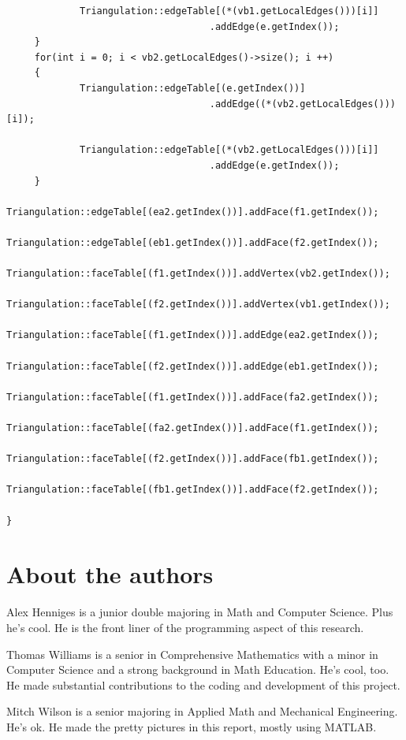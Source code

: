 \documentclass[12pt]{article}
\begin{document}
\begin{verbatim}
             Triangulation::edgeTable[(*(vb1.getLocalEdges()))[i]]
             						.addEdge(e.getIndex()); 
     }
     for(int i = 0; i < vb2.getLocalEdges()->size(); i ++)
     {
             Triangulation::edgeTable[(e.getIndex())]
             						.addEdge((*(vb2.getLocalEdges()))[i]); 
             						
             Triangulation::edgeTable[(*(vb2.getLocalEdges()))[i]]
             						.addEdge(e.getIndex()); 
     }
     Triangulation::edgeTable[(ea2.getIndex())].addFace(f1.getIndex()); 
     Triangulation::edgeTable[(eb1.getIndex())].addFace(f2.getIndex()); 
     Triangulation::faceTable[(f1.getIndex())].addVertex(vb2.getIndex());
     Triangulation::faceTable[(f2.getIndex())].addVertex(vb1.getIndex());
     Triangulation::faceTable[(f1.getIndex())].addEdge(ea2.getIndex());
     Triangulation::faceTable[(f2.getIndex())].addEdge(eb1.getIndex());
     Triangulation::faceTable[(f1.getIndex())].addFace(fa2.getIndex());
     Triangulation::faceTable[(fa2.getIndex())].addFace(f1.getIndex());
     Triangulation::faceTable[(f2.getIndex())].addFace(fb1.getIndex());
     Triangulation::faceTable[(fb1.getIndex())].addFace(f2.getIndex());
     
}
\end{verbatim}
\section*{About the authors}

Alex Henniges is a junior double majoring in Math and Computer Science. Plus he's cool. He is the front liner of the programming aspect of this research. \newline
  
\noindent Thomas Williams is a senior in Comprehensive Mathematics with a minor in Computer Science and a strong background in Math Education. He's cool, too. He made substantial contributions to the coding and development of this project.\newline
  
\noindent Mitch Wilson is a senior majoring in Applied Math and Mechanical Engineering. He's ok. He made the pretty pictures in this report, mostly using MATLAB. 
\end{document}
